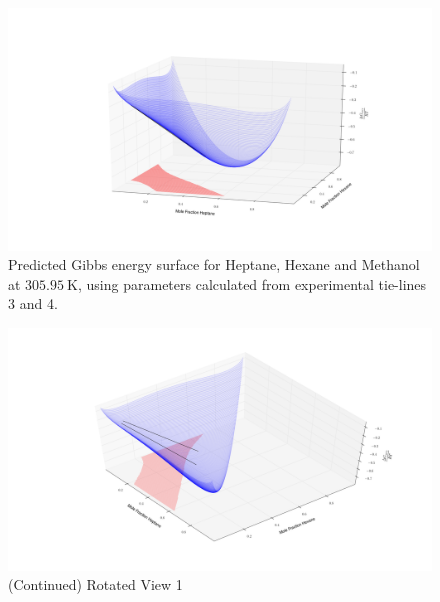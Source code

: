 \begin{figure}[hp]
 \vspace{40pt}
\centering
\includegraphics[width = \textwidth, bb=100 100 1600 700]{Results_Parts/TernaryParams/heptane-hexane-methanol/DWPMTieline3and4/rotation4.png}
\caption{Predicted Gibbs energy surface for Heptane, Hexane and Methanol at $305.95~\mathrm{K}$, using parameters calculated from experimental tie-lines 3 and 4.}
\end{figure}	

\begin{figure}[hp]
\vspace{40pt}
\ContinuedFloat
\centering
\includegraphics[width = \textwidth, bb=100 100 1600 700]{Results_Parts/TernaryParams/heptane-hexane-methanol/DWPMTieline3and4/rotation3.png}
\caption[]{(Continued) Rotated View 1}
\end{figure}

